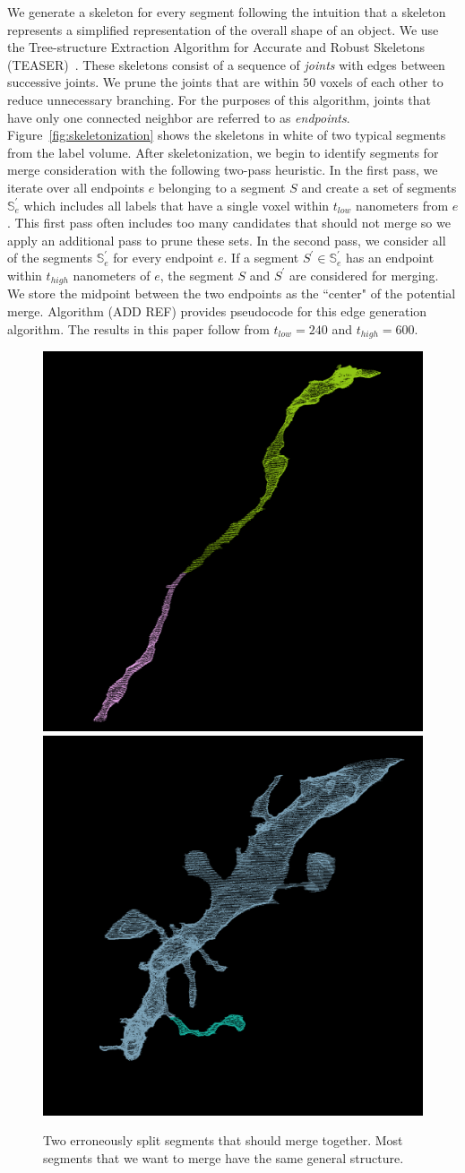We generate a skeleton for every segment following the intuition that a skeleton represents a simplified representation of the overall shape of an object. 
We use the Tree-structure Extraction Algorithm for Accurate and Robust Skeletons (TEASER)~\cite{sato2000teasar,zhao2014automatic}. 
These skeletons consist of a sequence of \textit{joints} with edges between successive joints. 
We prune the joints that are within $50$ voxels of each other to reduce unnecessary branching.
For the purposes of this algorithm, joints that have only one connected neighbor are referred to as \textit{endpoints}. 
Figure~\ref{fig:skeletonization} shows the skeletons in white of two typical segments from the label volume.
After skeletonization, we begin to identify segments for merge consideration with the following two-pass heuristic.
In the first pass, we iterate over all endpoints $e$ belonging to a segment $S$ and create a set of segments $\mathbb{S}_e^\prime$ which includes all labels that have a single voxel within $t_{low}$ nanometers from $e$. 
This first pass often includes too many candidates that should not merge so we apply an additional pass to prune these sets.
In the second pass, we consider all of the segments $\mathbb{S}_e^\prime$ for every endpoint $e$. 
If a segment $S^\prime \in \mathbb{S}_e^\prime$ has an endpoint within $t_{high}$ nanometers of $e$, the segment $S$ and $S^\prime$ are considered for merging. 
We store the midpoint between the two endpoints as the ``center" of the potential merge.
Algorithm (ADD REF) provides pseudocode for this edge generation algorithm. 
The results in this paper follow from $t_{low} = 240$ and $t_{high} = 600$. 

\begin{figure}[t]
	\centering
	\includegraphics[width=0.42\linewidth]{./figures/merge_candidate1.png}
	\hspace{0.085\linewidth}
	\includegraphics[width=0.42\linewidth]{./figures/merge_candidate2.png}
	\caption{Two erroneously split segments that should merge together. Most segments that we want to merge have the same general structure.}
	\label{fig:merge_candidates}
\end{figure}


